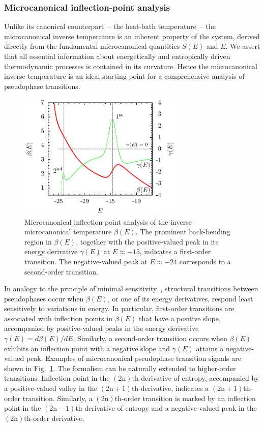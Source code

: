 \documentclass[12pt]{report}
\begin{document}
\subsubsection{Microcanonical inflection-point analysis}
Unlike its canonical counterpart~-- the heat-bath temperature~-- the
microcanonical inverse temperature is an inherent property of the system, derived directly from the fundamental microcanonical quantities $S(E)$ and $E$. We assert that all essential information about energetically and entropically driven thermodynamic processes is contained in its curvature. Hence the microcanonical inverse temperature is an ideal starting point for a comprehensive analysis of pseudophase transitions\cite{Gross2001}.  

%
\begin{figure}
\center
\includegraphics[width = 0.7\textwidth]{chapter2Figs/MicroAnalysisExample.eps}
\caption{\label{fig:Fig_1}%
Microcanonical inflection-point analysis of the inverse microcanonical temperature $\beta(E)$. The prominent back-bending region in $\beta(E)$, together with the positive-valued peak in its energy derivative $\gamma(E)$ at $E \approx -15$, indicates a first-order transition. The negative-valued peak at $E\approx -24$ corresponds to a second-order transition.}
\end{figure}
%

In analogy to the principle of minimal sensitivity~\cite{Stevenson}, structural transitions between pseudophases occur when $\beta(E)$, or one of its energy
derivatives, respond least sensitively to variations in energy\cite{Schnabel2011}. In particular, first-order transitions are associated with inflection points in $\beta (E)$ that have a positive slope, accompanied by positive-valued peaks in the energy derivative $\gamma(E)=d\beta(E)/dE$. Similarly, a second-order transition occurs when $\beta(E)$ exhibits an inflection point with a negative slope and $\gamma(E)$ attains a negative-valued peak. Examples of microcanonical pseudophase transition signals are shown in Fig.~\ref{fig:Fig_1}. The formalism can be naturally extended to higher-order transitions. Inflection point in the $(2\mathrm{n})$th-derivative of entropy, accompanied by a positive-valued valley in the $(2\mathrm{n}+1)$th-derivative, indicates a $(2\mathrm{n}+1)$th-order transition. Similarly, a $(2\mathrm{n})$th-order transition is marked by an inflection point in the $(2\mathrm{n}-1)$th-derivative of entropy and a negative-valued peak in the $(2\mathrm{n})$th-order derivative.
\end{document}
